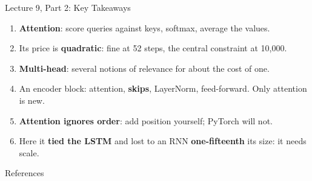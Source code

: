 \documentclass[aspectratio=169, 11pt]{beamer}
\begin{document}
\begin{frame}{Lecture 9, Part 2: Key Takeaways}
  \begin{keybox}
    {\small
    \begin{enumerate}\itemsep3pt
      \item \textbf{Attention}: score queries against keys, softmax, average the values.
      \item Its price is \textbf{quadratic}: fine at 52 steps, the central constraint at
            10{,}000.
      \item \textbf{Multi-head}: several notions of relevance for about the cost of one.
      \item An encoder block: attention, \textbf{skips}, LayerNorm, feed-forward. Only
            attention is new.
      \item \textbf{Attention ignores order}: add position yourself; PyTorch will not.
      \item Here it \textbf{tied the LSTM} and lost to an RNN \textbf{one-fifteenth} its size:
            it needs scale.
    \end{enumerate}
    }
  \end{keybox}
\end{frame}

\begin{frame}[allowframebreaks]{References}
  \printbibliography[heading=none]
\end{frame}
\end{document}
